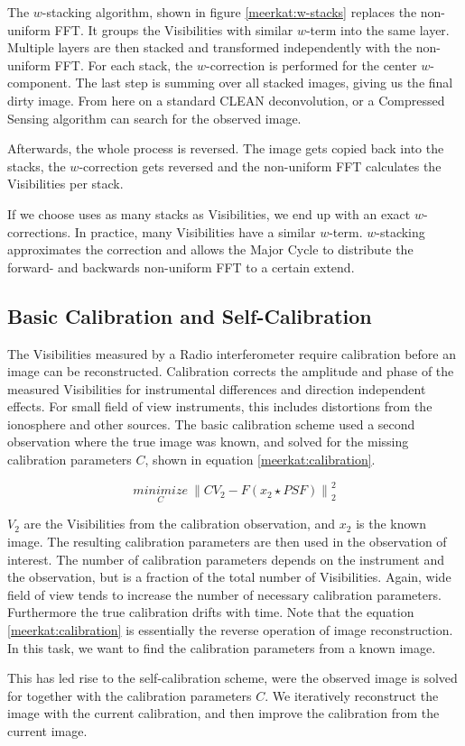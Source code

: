 The $w$-stacking algorithm, shown in figure \ref{meerkat:w-stacks} replaces the non-uniform FFT. It groups the Visibilities with similar $w$-term into the same layer. Multiple layers are then stacked and transformed independently with the non-uniform FFT. For each stack, the $w$-correction is performed for the center $w$-component. The last step is summing over all stacked images, giving us the final dirty image. From here on a standard CLEAN deconvolution, or a Compressed Sensing algorithm can search for the observed image.

Afterwards, the whole process is reversed. The image gets copied back into the stacks, the $w$-correction gets reversed and the non-uniform FFT calculates the Visibilities per stack.

If we choose uses as many stacks as Visibilities, we end up with an exact $w$-corrections. In practice, many Visibilities have a similar $w$-term. $w$-stacking approximates the correction and allows the Major Cycle to distribute the forward- and backwards non-uniform FFT to a certain extend.

\subsection{Basic Calibration and Self-Calibration}
The Visibilities measured by a Radio interferometer require calibration before an image can be reconstructed. Calibration corrects the amplitude and phase of the measured Visibilities for instrumental differences and direction independent effects. For small field of view instruments, this includes distortions from the ionosphere and other sources. The basic calibration scheme used a second observation where the true image was known, and solved for the missing calibration parameters $C$, shown in equation \eqref{meerkat:calibration}.

\begin{equation}\label{meerkat:calibration}
\underset{C}{minimize} \: \left \| CV_2 - F(x_2 \star PSF) \right \|_2^2
\end{equation}

$V_2$ are the Visibilities from the calibration observation, and $x_2$ is the known image. The resulting calibration parameters are then used in the observation of interest. The number of calibration parameters depends on the instrument and the observation, but is a fraction of the total number of Visibilities. Again, wide field of view tends to increase the number of necessary calibration parameters. Furthermore the true calibration drifts with time. Note that the equation \eqref{meerkat:calibration} is essentially the reverse operation of image reconstruction. In this task, we want to find the calibration parameters from a known image.

This has led rise to the self-calibration scheme, were the observed image is solved for together with the calibration parameters $C$. We iteratively reconstruct the image with the current calibration, and then improve the calibration from the current image.






